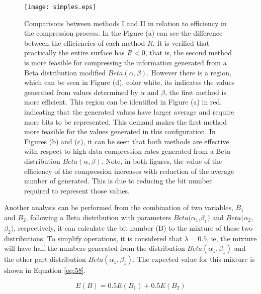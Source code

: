 \documentclass[10pt]{article}
\begin{document}
\begin{figure}[h]
  \centering
  \texttt{[image: simples.eps]}
  \caption{Comparisons between methods I and II in relation to efficiency in the compression process. In the Figure (a) can see the difference between the efficiencies of each method $R$. It is verified that practically the entire surface has $R<0$, that is, the second method is more feasible for compressing the information generated from a Beta distribution modified $Beta(\alpha,\beta)$. However there is a region, which can be seen in Figure (d), color white, its indicates the values ​​generated from values ​​determined by $\alpha$ and $\beta$, the first method is more efficient. This region can be identified in Figure (a) in red, indicating that the generated values ​​have larger average ​​and require more bits to be represented. This demand makes the first method more feasible for the values ​​generated in this configuration. In Figures (b) and (c), it can be seen that both methods are effective with respect to high data compression rates generated from a Beta distribution $Beta(\alpha,\beta)$. Note, in 
both figures, the value of the efficiency of the compression increases with reduction of the average number of generated. This is due to reducing the bit number required to represent those values.}
  \label{fig:03}
\end{figure}
 
Another analysis can be performed from the combination of two variables, $B_1$ and $B_2$, following a Beta distribution with parameters $Beta(\alpha_1$,$\beta_1)$ and $Beta(\alpha_2$,$\beta_2)$, respectively, it can calculate the bit number (B) to the mixture of these two distributions. To simplify operations, it is considered that $\lambda = 0.5$, ie, the mixture will have half the numbers generated from the distribution $Beta(\alpha_1,\beta_1)$ and the other part distribution $Beta(\alpha_1,\beta_1)$. The expected value for this mixture is shown in Equation \ref{eq:58}.
 
\begin{equation}\label{eq:58}
 E(B) = 0.5 E(B_1) + 0.5 E(B_2)
\end{equation}
 
\end{document}
